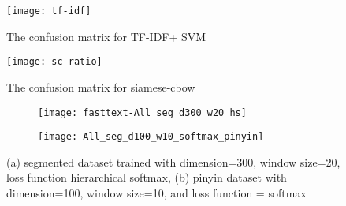 \begin{figure}[h]
    \centering
	\texttt{[image: tf-idf]}
    \caption{The confusion matrix for TF-IDF+ SVM}
    \label{confusion1}
\end{figure}

\begin{figure}[h]
    \centering
	\texttt{[image: sc-ratio]}
    \caption{The confusion matrix for siamese-cbow}
    \label{confusion2}
\end{figure}

\begin{figure}
\centering
\begin{subfigure}[b]{1\textwidth}
   \texttt{[image: fasttext-All\_seg\_d300\_w20\_hs]}
   \caption{}
   \label{confusion3} 
\end{subfigure}

\begin{subfigure}[b]{1\textwidth}
   \texttt{[image: All\_seg\_d100\_w10\_softmax\_pinyin]}
   \caption{}
   \label{confusion4}
\end{subfigure}
\caption[Confusion Matrix of FastText]{(a) segmented dataset trained with dimension=300, window size=20, loss function hierarchical softmax,
(b) pinyin dataset with dimension=100, window size=10, and loss function = softmax
}
\end{figure}
